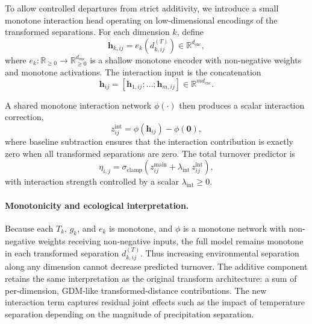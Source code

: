 \documentclass{article}
\begin{document}
To allow controlled departures from strict additivity, we introduce a small monotone interaction head operating on low-dimensional encodings of the transformed separations. For each dimension $k$, define
\begin{equation}
    \mathbf{h}_{k,ij}
    =
    e_k\!\left(d_{k,ij}^{(T)}\right)
    \in \mathbb{R}^{d_{\text{enc}}},
\end{equation}
where $e_k : \mathbb{R}_{\ge 0} \to \mathbb{R}_{\ge 0}^{d_{\text{enc}}}$ is a shallow monotone encoder with non-negative weights and monotone activations. The interaction input is the concatenation
\begin{equation}
    \mathbf{h}_{ij}
    =
    [\mathbf{h}_{1,ij}; \ldots; \mathbf{h}_{m,ij}]
    \in \mathbb{R}^{m d_{\text{enc}}}.
\end{equation}

A shared monotone interaction network $\phi(\cdot)$ then produces a scalar interaction correction,
\begin{equation}
    z_{ij}^{\text{int}}
    =
    \phi(\mathbf{h}_{ij}) - \phi(\mathbf{0}),
\end{equation}
where baseline subtraction ensures that the interaction contribution is exactly zero when all transformed separations are zero. The total turnover predictor is
\begin{equation}
    \eta_{i,j}
    =
    \sigma_{\text{clamp}}\!\left(
        z_{ij}^{\text{main}}
        +
        \lambda_{\text{int}}\, z_{ij}^{\text{int}}
    \right),
    \label{eq:transform-interaction-beta}
\end{equation}
with interaction strength controlled by a scalar $\lambda_{\text{int}} \ge 0$.

\paragraph{Monotonicity and ecological interpretation.}
Because each $T_k$, $g_k$, and $e_k$ is monotone, and $\phi$ is a monotone network with non-negative weights receiving non-negative inputs, the full model remains monotone in each transformed separation $d_{k,ij}^{(T)}$. Thus increasing environmental separation along any dimension cannot decrease predicted turnover. The additive component retains the same interpretation as the original transform architecture: a sum of per-dimension, GDM-like transformed-distance contributions. The new interaction term captures residual joint effects such as the impact of temperature separation depending on the magnitude of precipitation separation.
\end{document}
